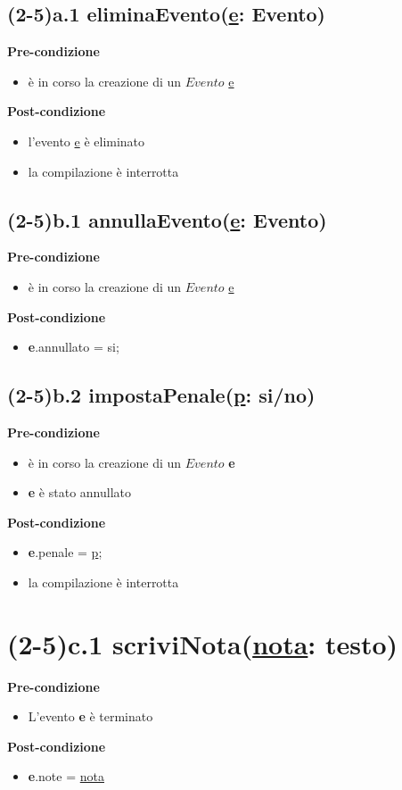 \documentclass[12pt]{extarticle}
\begin{document}
\subsection*{(2-5)a.1 eliminaEvento(\underline{e}: Evento)}

\textbf{Pre-condizione}
\begin{itemize}
  \item è in corso la creazione di un $Evento$ \underline{e}
\end{itemize}
\textbf{Post-condizione}
\begin{itemize}
  \item l'evento \underline{e} è eliminato
  \item la compilazione è interrotta
\end{itemize}  


\subsection*{(2-5)b.1 annullaEvento(\underline{e}: Evento)}

\textbf{Pre-condizione}
\begin{itemize}
  \item è in corso la creazione di un $Evento$ \underline{e} 
\end{itemize}
\textbf{Post-condizione}
\begin{itemize}
  \item \textbf{e}.annullato = si;
\end{itemize}  


\subsection*{(2-5)b.2 impostaPenale(\underline{p}: si/no)}
\textbf{Pre-condizione}
\begin{itemize}
  \item è in corso la creazione di un $Evento$ \textbf{e}
  \item \textbf{e} è stato annullato
\end{itemize}
\textbf{Post-condizione}
\begin{itemize}
  \item \textbf{e}.penale = \underline{p};
  \item la compilazione è interrotta
\end{itemize}  

\section*{(2-5)c.1 scriviNota(\underline{nota}: testo)}
\textbf{Pre-condizione}
\begin{itemize}
  \item L'evento \textbf{e} è terminato
\end{itemize}
\textbf{Post-condizione}
\begin{itemize}
  \item \textbf{e}.note = \underline{nota}
\end{itemize}
\end{document}
